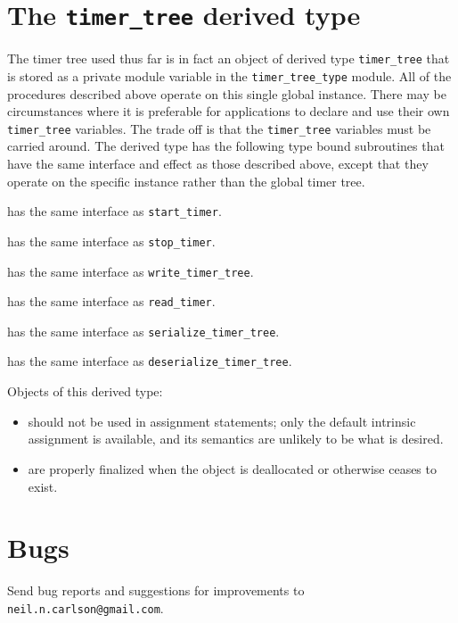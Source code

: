 \documentclass[11pt]{article}
\begin{document}
\section{The \texttt{timer_tree} derived type}
The timer tree used thus far is in fact an object of derived type
\texttt{timer_tree} that is stored as a private module variable in the
\texttt{timer_tree_type} module.  All of the procedures described above
operate on this single global instance.  There may be circumstances where
it is preferable for applications to declare and use their own
\texttt{timer_tree}
variables.  The trade off is that the \texttt{timer_tree} variables must be
carried around.  The derived type has the following type bound subroutines
that have the same interface and effect as those described above, except
that they operate on the specific instance rather than the global timer tree.
\begin{description}\setlength{\itemsep}{0pt}
\item[\texttt{start(name [,handle])}]
  has the same interface as \texttt{start_timer}.
\item[\texttt{stop(name [,stat [,errmsg]])}]
  has the same interface as \texttt{stop_timer}.
\item[\texttt{write(unit, indent [,handle])}]
  has the same interface as \texttt{write_timer_tree}.
\item[\texttt{read(handle, cpu)}]
  has the same interface as \texttt{read_timer}.
\item[\texttt{serialize(tree, name, cpu)}]
  has the same interface as \texttt{serialize_timer_tree}.
\item[\texttt{deserialize(tree, name, cpu)}]
  has the same interface as \texttt{deserialize_timer_tree}.
\end{description}
Objects of this derived type:
\begin{itemize}\setlength{\itemsep}{0pt}
\item
  should not be used in assignment statements; only the default intrinsic
  assignment is available, and its semantics are unlikely to be what is
  desired.
\item
  are properly finalized when the object is deallocated or otherwise
  ceases to exist.
\end{itemize}

\section{Bugs}
Send bug reports and suggestions for improvements to
\texttt{neil.n.carlson@gmail.com}.
\end{document}

